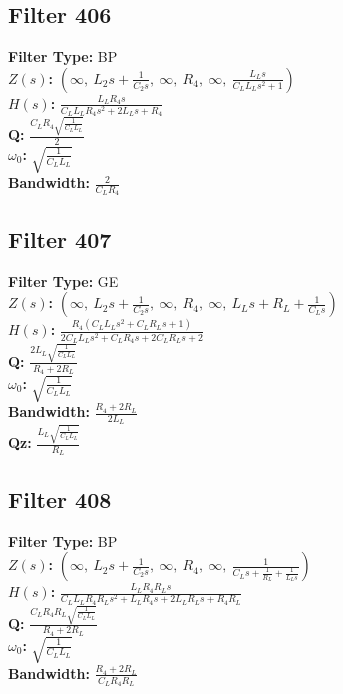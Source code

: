 \documentclass{article}
\begin{document}
\subsection*{Filter 406}
\textbf{Filter Type:} BP \\ 
\textbf{$Z(s)$:} $\left( \infty, \  L_{2} s + \frac{1}{C_{2} s}, \  \infty, \  R_{4}, \  \infty, \  \frac{L_{L} s}{C_{L} L_{L} s^{2} + 1}\right)$ \\ 
\textbf{$H(s)$:} $\frac{L_{L} R_{4} s}{C_{L} L_{L} R_{4} s^{2} + 2 L_{L} s + R_{4}}$ \\ 
\textbf{Q:} $\frac{C_{L} R_{4} \sqrt{\frac{1}{C_{L} L_{L}}}}{2}$ \\ 
\textbf{$\omega_0$:} $\sqrt{\frac{1}{C_{L} L_{L}}}$ \\ 
\textbf{Bandwidth:} $\frac{2}{C_{L} R_{4}}$ \\ 
\subsection*{Filter 407}
\textbf{Filter Type:} GE \\ 
\textbf{$Z(s)$:} $\left( \infty, \  L_{2} s + \frac{1}{C_{2} s}, \  \infty, \  R_{4}, \  \infty, \  L_{L} s + R_{L} + \frac{1}{C_{L} s}\right)$ \\ 
\textbf{$H(s)$:} $\frac{R_{4} \left(C_{L} L_{L} s^{2} + C_{L} R_{L} s + 1\right)}{2 C_{L} L_{L} s^{2} + C_{L} R_{4} s + 2 C_{L} R_{L} s + 2}$ \\ 
\textbf{Q:} $\frac{2 L_{L} \sqrt{\frac{1}{C_{L} L_{L}}}}{R_{4} + 2 R_{L}}$ \\ 
\textbf{$\omega_0$:} $\sqrt{\frac{1}{C_{L} L_{L}}}$ \\ 
\textbf{Bandwidth:} $\frac{R_{4} + 2 R_{L}}{2 L_{L}}$ \\ 
\textbf{Qz:} $\frac{L_{L} \sqrt{\frac{1}{C_{L} L_{L}}}}{R_{L}}$ \\ 
\subsection*{Filter 408}
\textbf{Filter Type:} BP \\ 
\textbf{$Z(s)$:} $\left( \infty, \  L_{2} s + \frac{1}{C_{2} s}, \  \infty, \  R_{4}, \  \infty, \  \frac{1}{C_{L} s + \frac{1}{R_{L}} + \frac{1}{L_{L} s}}\right)$ \\ 
\textbf{$H(s)$:} $\frac{L_{L} R_{4} R_{L} s}{C_{L} L_{L} R_{4} R_{L} s^{2} + L_{L} R_{4} s + 2 L_{L} R_{L} s + R_{4} R_{L}}$ \\ 
\textbf{Q:} $\frac{C_{L} R_{4} R_{L} \sqrt{\frac{1}{C_{L} L_{L}}}}{R_{4} + 2 R_{L}}$ \\ 
\textbf{$\omega_0$:} $\sqrt{\frac{1}{C_{L} L_{L}}}$ \\ 
\textbf{Bandwidth:} $\frac{R_{4} + 2 R_{L}}{C_{L} R_{4} R_{L}}$ \\ 
\end{document}
